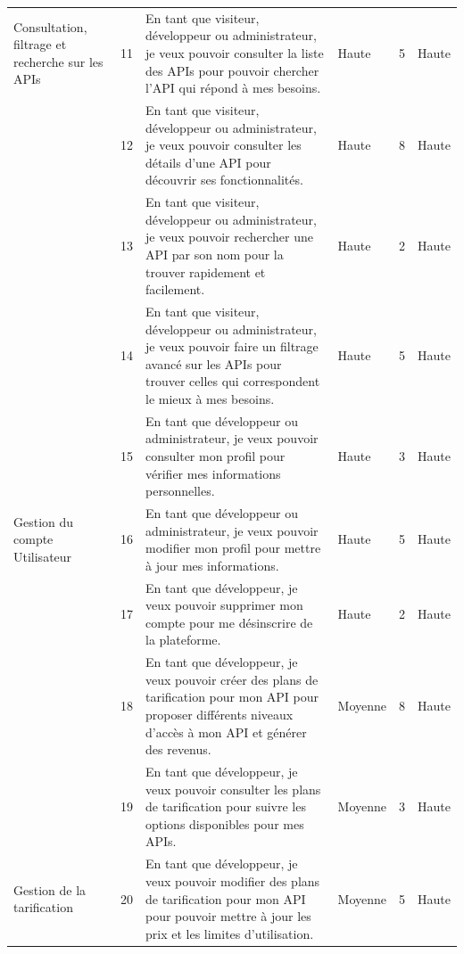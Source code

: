 \begin{landscape}
\begin{longtable}[c]{
    |p{}
    |p{}
    |p{}
    |p{}
    |p{}
    |p{}|
    }
Consultation, filtrage et recherche sur les APIs & 11 & En tant que visiteur, développeur ou administrateur, je veux pouvoir consulter la liste des APIs pour pouvoir chercher l’API qui répond à mes besoins. & Haute & 5 & Haute \\
\cline{2-2} \cline{3-6}

 & 12 & En tant que visiteur, développeur ou administrateur, je veux pouvoir consulter les détails d'une API pour découvrir ses fonctionnalités. & Haute & 8 & Haute \\
\cline{2-2} \cline{3-6}

 & 13 & En tant que visiteur, développeur ou administrateur, je veux pouvoir rechercher une API par son nom pour la trouver rapidement et facilement. & Haute & 2 & Haute \\
\cline{2-2} \cline{3-6}

 & 14 & En tant que visiteur, développeur ou administrateur, je veux pouvoir faire un filtrage avancé sur les APIs pour trouver celles qui correspondent le mieux à mes besoins. & Haute & 5 & Haute \\
\hline
 & 15 & En tant que développeur ou administrateur, je veux pouvoir consulter mon profil pour vérifier mes informations personnelles. & Haute & 3 & Haute \\
\cline{2-2} \cline{3-6}
Gestion du compte Utilisateur & 16 & En tant que développeur ou administrateur, je veux pouvoir modifier mon profil pour mettre à jour mes informations. & Haute & 5 & Haute \\
\cline{2-2} \cline{3-6}
 & 17 & En tant que développeur, je veux pouvoir supprimer mon compte pour me désinscrire de la plateforme. & Haute & 2 & Haute \\
\hline

 & 18 & En tant que développeur, je veux pouvoir créer des plans de tarification pour mon API pour proposer différents niveaux d'accès à mon API et générer des revenus. & Moyenne & 8 & Haute \\
\cline{2-2} \cline{3-6}

 & 19 & En tant que développeur, je veux pouvoir consulter les plans de tarification pour suivre les options disponibles pour mes APIs. & Moyenne & 3 & Haute \\
\cline{2-2} \cline{3-6}

Gestion de la tarification  & 20 & En tant que développeur, je veux pouvoir modifier des plans de tarification pour mon API pour pouvoir mettre à jour les prix et les limites d'utilisation. & Moyenne & 5 & Haute \\
\cline{2-2} \cline{3-6}


\end{longtable}
\end{landscape}
